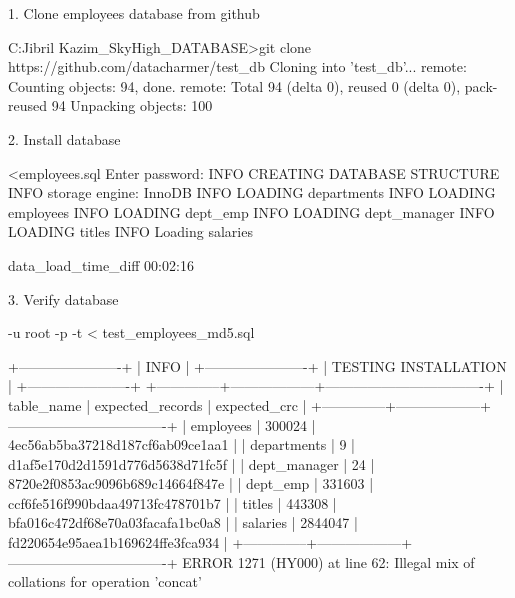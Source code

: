 1. Clone employees database from github

C:\Users\Muhd Jibril Kazim\Documents\_SkyHigh\_DATABASE>git clone https://github.com/datacharmer/test_db
Cloning into 'test_db'...
remote: Counting objects: 94, done.
remote: Total 94 (delta 0), reused 0 (delta 0), pack-reused 94
Unpacking objects: 100%

2. Install database

 <employees.sql
Enter password:
INFO
CREATING DATABASE STRUCTURE
INFO
storage engine: InnoDB
INFO
LOADING departments
INFO
LOADING employees
INFO
LOADING dept_emp
INFO
LOADING dept_manager
INFO
LOADING titles
INFO
Loading salaries

data_load_time_diff
00:02:16

3. Verify database

-u root -p -t < test_employees_md5.sql

+----------------------+
| INFO                 |
+----------------------+
| TESTING INSTALLATION |
+----------------------+
+--------------+------------------+----------------------------------+
| table_name   | expected_records | expected_crc                     |
+--------------+------------------+----------------------------------+
| employees    |           300024 | 4ec56ab5ba37218d187cf6ab09ce1aa1 |
| departments  |                9 | d1af5e170d2d1591d776d5638d71fc5f |
| dept_manager |               24 | 8720e2f0853ac9096b689c14664f847e |
| dept_emp     |           331603 | ccf6fe516f990bdaa49713fc478701b7 |
| titles       |           443308 | bfa016c472df68e70a03facafa1bc0a8 |
| salaries     |          2844047 | fd220654e95aea1b169624ffe3fca934 |
+--------------+------------------+----------------------------------+
ERROR 1271 (HY000) at line 62: Illegal mix of collations for operation 'concat'


